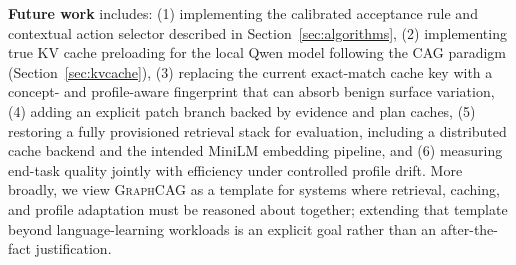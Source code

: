 \documentclass[11pt,a4paper,twocolumn]{article}
\newcommand{\graphcag}{\textsc{GraphCAG}}
\begin{document}
\textbf{Future work} includes: (1) implementing the calibrated acceptance rule and contextual action selector described in Section~\ref{sec:algorithms}, (2) implementing true KV cache preloading for the local Qwen model following the CAG paradigm (Section~\ref{sec:kvcache}), (3) replacing the current exact-match cache key with a concept- and profile-aware fingerprint that can absorb benign surface variation, (4) adding an explicit patch branch backed by evidence and plan caches, (5) restoring a fully provisioned retrieval stack for evaluation, including a distributed cache backend and the intended MiniLM embedding pipeline, and (6) measuring end-task quality jointly with efficiency under controlled profile drift. More broadly, we view \graphcag{} as a template for systems where retrieval, caching, and profile adaptation must be reasoned about together; extending that template beyond language-learning workloads is an explicit goal rather than an after-the-fact justification.
\end{document}
